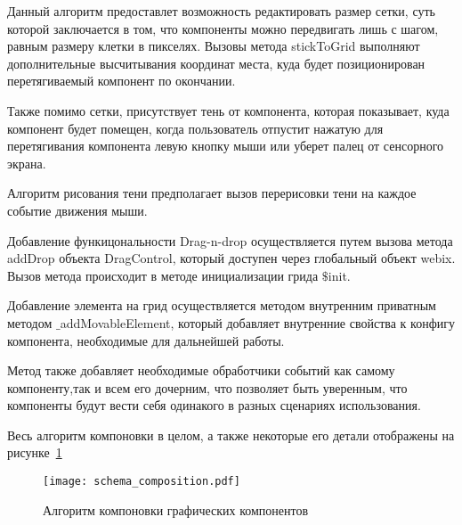 Данный алгоритм предоставлет возможность редактировать размер сетки, суть которой заключается в том, что компоненты можно передвигать лишь с шагом, равным размеру клетки в пикселях. Вызовы метода stickToGrid выполняют дополнительные высчитывания координат места, куда будет позиционирован перетягиваемый компонент по окончании.

Также помимо сетки, присутствует тень от компонента, которая показывает, куда компонент будет помещен, когда пользователь отпустит нажатую для перетягивания компонента левую кнопку мыши или уберет палец от сенсорного экрана.

Алгоритм рисования тени предполагает вызов перерисовки тени на каждое событие движения мыши.

Добавление функицональности Drag-n-drop осуществляется путем вызова метода addDrop объекта DragControl, который доступен через глобальный объект webix.
Вызов метода происходит в методе инициализации грида $\$$init.

Добавление элемента на грид осуществляется методом внутренним приватным методом $\_$addMovableElement, который добавляет внутренние свойства к конфигу компонента, необходимые для дальнейшей работы.

Метод также добавляет необходимые обработчики событий как самому компоненту,так и всем его дочерним, что позволяет быть уверенным, что компоненты будут вести себя одинакого в разных сценариях использования.

Весь алгоритм компоновки в целом, а также некоторые его детали отображены на рисунке~\ref{sec:dev:composition}\pagebreak

\begin{figure}[ht]
  \centering
    \texttt{[image: schema\_composition.pdf]}
    \caption{Алгоритм компоновки графических компонентов}
    \label{sec:dev:composition}
\end{figure}